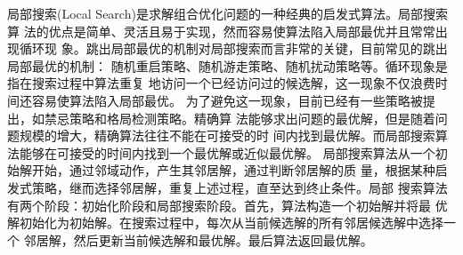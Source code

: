 局部搜索(Local Search)是求解组合优化问题的一种经典的启发式算法。局部搜索算
法的优点是简单、灵活且易于实现，然而容易使算法陷入局部最优并且常常出现循环现
象。跳出局部最优的机制对局部搜索而言非常的关键，目前常见的跳出局部最优的机制：
随机重启策略、随机游走策略、随机扰动策略等。循环现象是指在搜索过程中算法重复
地访问一个已经访问过的候选解，这一现象不仅浪费时间还容易使算法陷入局部最优。
为了避免这一现象，目前已经有一些策略被提出，如禁忌策略和格局检测策略。精确算
法能够求出问题的最优解，但是随着问题规模的增大，精确算法往往不能在可接受的时
间内找到最优解。而局部搜索算法能够在可接受的时间内找到一个最优解或近似最优解。
局部搜索算法从一个初始解开始，通过邻域动作，产生其邻居解，通过判断邻居解的质
量，根据某种启发式策略，继而选择邻居解，重复上述过程，直至达到终止条件。局部
搜索算法有两个阶段：初始化阶段和局部搜索阶段。首先，算法构造一个初始解并将最
优解初始化为初始解。在搜索过程中，每次从当前候选解的所有邻居候选解中选择一个
邻居解，然后更新当前候选解和最优解。最后算法返回最优解。
